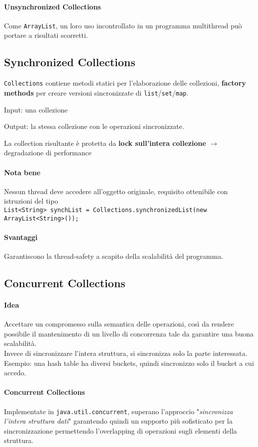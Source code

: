\documentclass[10pt]{article}
\begin{document}
\paragraph{Unsynchronized Collections} Come \texttt{ArrayList}, un loro uso incontrollato in un programma multithread può portare a risultati scorretti.
\subsection{Synchronized Collections}
\texttt{Collections} contiene metodi statici per l'elaborazione delle collezioni, \textbf{factory methods} per creare versioni sincronizzate di \texttt{list}/\texttt{set}/\texttt{map}.\begin{list}{}{}
	\item Input: una collezione
	\item Output: la stessa collezione con le operazioni sincronizzate.
\end{list}
La collection risultante è protetta da \textbf{lock sull'intera collezione} $\rightarrow$ degradazione di performance
\paragraph{Nota bene} Nessun thread deve accedere all'oggetto originale, requisito ottenibile con istruzioni del tipo\\\texttt{List<String> synchList = Collections.synchronizedList(new ArrayList<String>());}
\paragraph{Svantaggi} Garantiscono la thread-safety a scapito della scalabilità del programma.
\subsection{Concurrent Collections}
\paragraph{Idea} Accettare un compromesso sulla semantica delle operazioni, così da rendere possibile il mantenimento di un livello di concorrenza tale da garantire una buona scalabilità.\\
Invece di sincronizzare l'intera struttura, si sincronizza solo la parte interessata. Esempio: una hash table ha diversi buckets, quindi sincronizzo solo il bucket a cui accedo.
\paragraph{Concurrent Collections} Implementate in \texttt{java.util.concurrent}, superano l'approccio "\textit{sincronizza l'intera struttura dati}" garantendo quindi un supporto più sofisticato per la sincronizzazione permettendo l'overlapping di operazioni sugli elementi della struttura.
\end{document}
